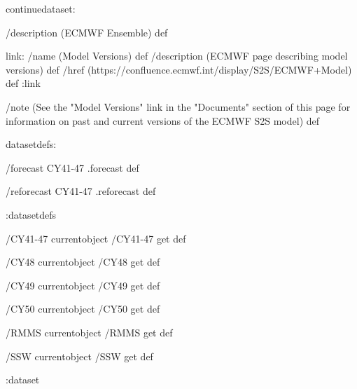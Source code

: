 \begin{ingrid}
continuedataset:

/description (ECMWF Ensemble) def


link:
 /name (Model Versions) def
 /description (ECMWF page describing model versions) def
 /href (https://confluence.ecmwf.int/display/S2S/ECMWF+Model) def
:link

/note (See the "Model Versions" link in the "Documents" section of this page for information on past and current versions of the ECMWF S2S model) def

datasetdefs:

/forecast { CY41-47 .forecast } def

/reforecast { CY41-47 .reforecast } def

:datasetdefs

/CY41-47 currentobject /CY41-47 get def

/CY48 currentobject /CY48 get def

/CY49 currentobject /CY49 get def 

/CY50 currentobject /CY50 get def

/RMMS currentobject /RMMS get def

/SSW currentobject /SSW get def

:dataset
\end{ingrid}
